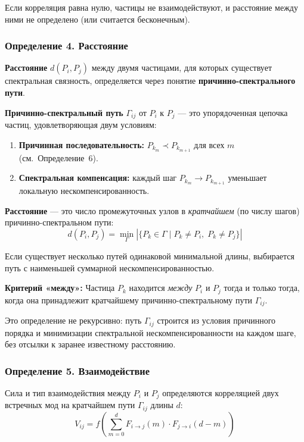 \documentclass[12pt,a4paper]{article}
\begin{document}
Если корреляция равна нулю, частицы не взаимодействуют, и расстояние между ними не определено (или считается бесконечным).

\subsubsection{Определение 4. Расстояние}
\textbf{Расстояние} $d(P_i, P_j)$ между двумя частицами, для которых существует спектральная связность, определяется через понятие \textbf{причинно-спектрального пути}.

\textbf{Причинно-спектральный путь} $\Gamma_{ij}$ от $P_i$ к $P_j$ --- это упорядоченная цепочка частиц, удовлетворяющая двум условиям:
\begin{enumerate}[label=(\arabic*)]
    \item \textbf{Причинная последовательность:} $P_{k_m} \prec P_{k_{m+1}}$ для всех $m$ (см.~Определение~6).
    \item \textbf{Спектральная компенсация:} каждый шаг $P_{k_m} \to P_{k_{m+1}}$ уменьшает локальную нескомпенсированность.
\end{enumerate}

\textbf{Расстояние} --- это число промежуточных узлов в \textit{кратчайшем} (по числу шагов) причинно-спектральном пути:
\begin{equation}
    \boxed{d(P_i, P_j) = \min_{\Gamma} |\{P_k \in \Gamma \mid P_k \neq P_i,\; P_k \neq P_j\}|}
\end{equation}

Если существует несколько путей одинаковой минимальной длины, выбирается путь с наименьшей суммарной нескомпенсированностью.

\textbf{Критерий «между»:} Частица $P_k$ находится \textit{между} $P_i$ и $P_j$ тогда и только тогда, когда она принадлежит кратчайшему причинно-спектральному пути $\Gamma_{ij}$.

Это определение не рекурсивно: путь $\Gamma_{ij}$ строится из условия причинного порядка и минимизации спектральной нескомпенсированности на каждом шаге, без отсылки к заранее известному расстоянию.

\subsubsection{Определение 5. Взаимодействие}
Сила и тип взаимодействия между $P_i$ и $P_j$ определяются корреляцией двух встречных мод на кратчайшем пути $\Gamma_{ij}$ длины $d$:
\begin{equation}
    V_{ij} = f\left( \sum_{m=0}^{d} F_{i \to j}(m) \cdot F_{j \to i}(d-m) \right)
\end{equation}
\end{document}
